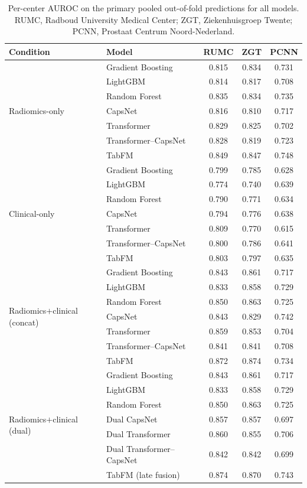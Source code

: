\documentclass[11pt]{article}
\begin{document}
\begin{table}[htbp]
\centering
\caption{Per-center AUROC on the primary pooled out-of-fold predictions for all
models. RUMC, Radboud University Medical Center; ZGT, Ziekenhuisgroep Twente;
PCNN, Prostaat Centrum Noord-Nederland.}
\label{tab:percenter_full}
\begin{tabular}{llccc}
\toprule
Condition & Model & RUMC & ZGT & PCNN \\
\midrule
\multirow{7}{*}{Radiomics-only}
 & Gradient Boosting & 0.815 & 0.834 & 0.731 \\
 & LightGBM & 0.814 & 0.817 & 0.708 \\
 & Random Forest & 0.835 & 0.834 & 0.735 \\
 & CapsNet & 0.816 & 0.810 & 0.717 \\
 & Transformer & 0.829 & 0.825 & 0.702 \\
 & Transformer--CapsNet & 0.828 & 0.819 & 0.723 \\
 & TabFM & 0.849 & 0.847 & 0.748 \\
\midrule
\multirow{7}{*}{Clinical-only}
 & Gradient Boosting & 0.799 & 0.785 & 0.628 \\
 & LightGBM & 0.774 & 0.740 & 0.639 \\
 & Random Forest & 0.790 & 0.771 & 0.634 \\
 & CapsNet & 0.794 & 0.776 & 0.638 \\
 & Transformer & 0.809 & 0.770 & 0.615 \\
 & Transformer--CapsNet & 0.800 & 0.786 & 0.641 \\
 & TabFM & 0.803 & 0.797 & 0.635 \\
\midrule
\multirow{7}{*}{Radiomics$+$clinical (concat)}
 & Gradient Boosting & 0.843 & 0.861 & 0.717 \\
 & LightGBM & 0.833 & 0.858 & 0.729 \\
 & Random Forest & 0.850 & 0.863 & 0.725 \\
 & CapsNet & 0.843 & 0.829 & 0.742 \\
 & Transformer & 0.859 & 0.853 & 0.704 \\
 & Transformer--CapsNet & 0.841 & 0.841 & 0.708 \\
 & TabFM & 0.872 & 0.874 & 0.734 \\
\midrule
\multirow{7}{*}{Radiomics$+$clinical (dual)}
 & Gradient Boosting & 0.843 & 0.861 & 0.717 \\
 & LightGBM & 0.833 & 0.858 & 0.729 \\
 & Random Forest & 0.850 & 0.863 & 0.725 \\
 & Dual CapsNet & 0.857 & 0.857 & 0.697 \\
 & Dual Transformer & 0.860 & 0.855 & 0.706 \\
 & Dual Transformer--CapsNet & 0.842 & 0.842 & 0.699 \\
 & TabFM (late fusion) & 0.874 & 0.870 & 0.743 \\
\bottomrule
\end{tabular}
\end{table}
\end{document}
